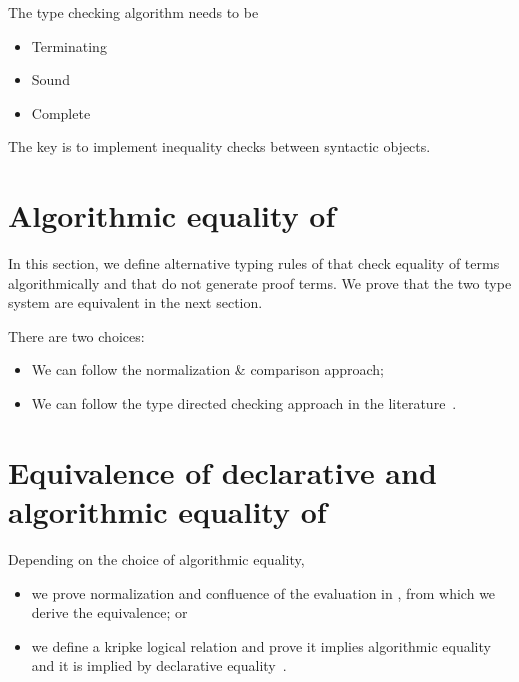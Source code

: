 \documentclass[10pt]{article}
\begin{document}
The type checking algorithm needs to be 

\begin{itemize}
\item Terminating
\item Sound
\item Complete
\end{itemize}

The key is to implement inequality checks between syntactic objects.

\section{Algorithmic equality of \STLCC}

In this section, we define alternative typing rules of \STLCC that
check equality of terms algorithmically and that do not generate proof
terms. We prove that the two type system are equivalent in the next
section.

There are two choices:

\begin{itemize}
\item We can follow the normalization \& comparison approach;
\item We can follow the type directed checking approach in the
  literature~\cite{harper05,cave18}\cite[Chapter~6]{pierce04}.
\end{itemize}


\section{Equivalence of declarative and algorithmic equality of \STLCC}

Depending on the choice of algorithmic equality,
%
\begin{itemize}
\item we prove normalization and confluence of the evaluation in
  \STLCC, from which we derive the equivalence; or
\item we define a kripke logical relation and prove it implies
  algorithmic equality and it is implied by declarative
  equality~\cite{harper05,cave18}\cite[Chapter~6]{pierce04}.
\end{itemize}

 
\end{document}
